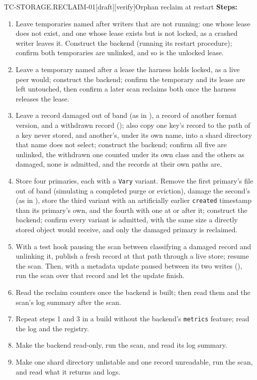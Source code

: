 \begin{requirement}{TC-STORAGE.RECLAIM-01}[draft][verify]{Orphan reclaim at restart}
  \textbf{Steps:}
  \begin{enumerate}
    \item Leave temporaries named after writers that are not running: one
      whose lease does not exist, and one whose lease exists but is not
      locked, as a crashed writer leaves it. Construct the backend (running
      its restart procedure); confirm both temporaries are unlinked, and so
      is the unlocked lease.
    \item Leave a temporary named after a lease the harness holds locked, as
      a live peer would; construct the backend; confirm the temporary and
      its lease are left untouched, then confirm a later scan reclaims both
      once the harness releases the lease.
    \item Leave a record damaged out of band (as in
      ), a record of another format version,
      and a withdrawn record (); also copy
      one key's record to the path of a key never stored, and another's,
      under its own name, into a shard directory that name does not select;
      construct the backend; confirm all five are unlinked, the withdrawn one
      counted under its own class and the others as damaged, none is
      admitted, and the records at their own paths are.
    \item Store four primaries, each with a \texttt{Vary} variant. Remove the
      first primary's file out of band (simulating a completed purge or
      eviction), damage the second's (as in
      ), store the third variant with an
      artificially earlier \texttt{created} timestamp than its primary's
      own, and the fourth with one at or after it; construct the backend;
      confirm every variant is admitted, with the same size a directly
      stored object would receive, and only the damaged primary is
      reclaimed.
    \item With a test hook pausing the scan between classifying a damaged
      record and unlinking it, publish a fresh record at that path through
      a live store; resume the scan. Then, with a metadata update paused
      between its two writes (), run the
      scan over that record and let the update finish.
    \item Read the reclaim counters once the backend is built; then read
      them and the scan's log summary after the scan.
    \item Repeat steps 1 and 3 in a build without the backend's
      \texttt{metrics} feature; read the log and the registry.
    \item Make the backend read-only, run the scan, and read its log summary.
    \item Make one shard directory unlistable and one record unreadable, run
      the scan, and read what it returns and logs.
  \end{enumerate}


\end{requirement}
